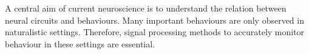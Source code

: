 A central aim of current neuroscience is to understand the relation between
neural circuits and behaviours. Many important behaviours are only observed in
naturalistic settings. Therefore, signal processing methods to accurately
monitor behaviour in these settings are essential.
